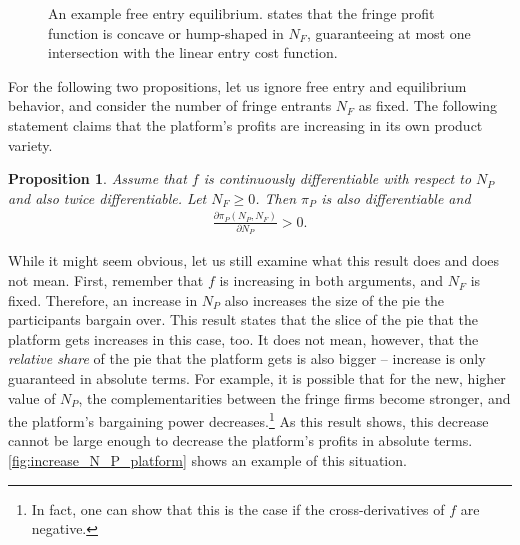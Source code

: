 \documentclass[a4paper]{article}
\newtheorem{proposition}{Proposition}
\begin{document}
\begin{figure}[ht]
    \centering
    \caption{An example free entry equilibrium.  states that the fringe profit function is concave or hump-shaped in $N_F$, guaranteeing at most one intersection with the linear entry cost function.}
    \label{fig:equilibrium}
\end{figure}

For the following two propositions, let us ignore free entry and equilibrium behavior, and consider the number of fringe entrants $N_F$ as fixed.
The following statement claims that the platform's profits are increasing in its own product variety.
\begin{proposition}
    \label{prop:share_of_platform}
    Assume that $f$ is continuously differentiable with respect to $N_P$ and also twice differentiable.
    Let $N_F \geq 0$.
    Then $\pi_P$ is also differentiable and
    \begin{align*}
        \frac{\partial \pi_P(N_P, N_F)}{\partial N_P} > 0.
    \end{align*}
\end{proposition}
While it might seem obvious, let us still examine what this result does and does not mean.
First, remember that $f$ is increasing in both arguments, and $N_F$ is fixed.
Therefore, an increase in $N_P$ also increases the size of the pie the participants bargain over.
This result states that the slice of the pie that the platform gets increases in this case, too.
It does not mean, however, that the \emph{relative share} of the pie that the platform gets is also bigger -- increase is only guaranteed in absolute terms.
For example, it is possible that for the new, higher value of $N_P$, the complementarities between the fringe firms become stronger, and the platform's bargaining power decreases.\footnote{
    In fact, one can show that this is the case if the cross-derivatives of $f$ are negative.
}
As this result shows, this decrease cannot be large enough to decrease the platform's profits in absolute terms.
\cref{fig:increase_N_P_platform} shows an example of this situation.
\end{document}
